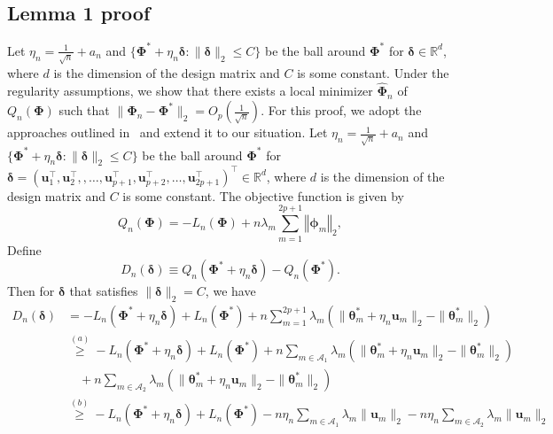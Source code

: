 \documentclass[a4paper,fleqn]{cas-sc}
\newcommand{\ddd}{,\ldots,}
\newcommand{\btheta}{\boldsymbol{\theta}}
\newcommand{\bdelta}{\boldsymbol{\delta}}
\begin{document}
\subsection{Lemma 1 proof}

{\normalsize{}Let $\eta_{n}=\frac{1}{\sqrt{n}}+a_{n}$ and $\{\boldsymbol{\Phi}^{*}+\eta_{n}\boldsymbol{\delta}:\|\boldsymbol{\delta}\|_{2}\leq C\}$
	be the ball around $\boldsymbol{\Phi}^{*}$ for $\boldsymbol{\delta}\in\mathbb{R}^{d}$,
	where $d$ is the dimension of the design matrix and $C$ is some
	constant. Under the regularity assumptions, we show that there exists
	a local minimizer $\widehat{\boldsymbol{\Phi}}_{n}$ of $Q_{n}(\boldsymbol{\Phi})$
	such that $\|\widehat{\boldsymbol{\Phi}}_{n}-\boldsymbol{\Phi}^{*}\|_{2}=O_{p}(\frac{1}{\sqrt{n}})$.
	For this proof, we adopt the approaches outlined in~\citep{fan2001variable,choi2010variable,nardi2008asymptotic,wang2007regression}
	and extend it to our situation. Let $\eta_{n}=\frac{1}{\sqrt{n}}+a_{n}$
	and $\{\boldsymbol{\Phi}^{*}+\eta_{n}\boldsymbol{\delta}:\|\boldsymbol{\delta}\|_{2}\leq C\}$
	be the ball around $\boldsymbol{\Phi}^{*}$ for $\boldsymbol{\delta}=(\mathbf{u}_{1}^{\top},\mathbf{u}_{2}^{\top},\ddd\mathbf{u}_{p+1}^{\top},\mathbf{u}_{p+2}^{\top},\ldots,\mathbf{u}_{2p+1}^{\top})^{\top}\in\mathbb{R}^{d}$,
	where $d$ is the dimension of the design matrix and $C$ is some
	constant. The objective function is given by 
	\[
	Q_{n}(\boldsymbol{\Phi})=-L_{n}(\boldsymbol{\Phi})+n\lambda_{m}\sum_{m=1}^{2p+1}\left\Vert \boldsymbol{\phi}_{m}\right\Vert _{2},
	\]
	Define
	\[
	D_{n}(\boldsymbol{\delta})\equiv Q_{n}(\boldsymbol{\Phi}^{*}+\eta_{n}\bdelta)-Q_{n}(\boldsymbol{\Phi}^{*}).
	\]
	Then for $\bdelta$ that satisfies $\|\bdelta\|_{2}=C$, we have
	\begin{align}
	D_{n}(\bdelta) & =-L_{n}(\boldsymbol{\Phi}^{*}+\eta_{n}\bdelta)+L_{n}(\boldsymbol{\Phi}^{*})+n\sum_{m=1}^{2p+1}\lambda_{m}(\|\btheta_{m}^{*}+\eta_{n}\mathbf{u}_{m}\|_{2}-\|\btheta_{m}^{*}\|_{2})\nonumber \\
	& \overset{(a)}{\geq}-L_{n}(\boldsymbol{\Phi}^{*}+\eta_{n}\bdelta)+L_{n}(\boldsymbol{\Phi}^{*})+n\sum_{m\in\mathcal{A}_{1}}\lambda_{m}(\|\btheta_{m}^{*}+\eta_{n}\mathbf{u}_{m}\|_{2}-\|\btheta_{m}^{*}\|_{2})\nonumber \\
	& \quad+n\sum_{m\in\mathcal{A}_{2}}\lambda_{m}(\|\btheta_{m}^{*}+\eta_{n}\mathbf{u}_{m}\|_{2}-\|\btheta_{m}^{*}\|_{2})\nonumber \\
	& \overset{(b)}{\geq}-L_{n}(\boldsymbol{\Phi}^{*}+\eta_{n}\bdelta)+L_{n}(\boldsymbol{\Phi}^{*})-n\eta_{n}\sum_{m\in\mathcal{A}_{1}}\lambda_{m}\|\mathbf{u}_{m}\|_{2}-n\eta_{n}\sum_{m\in\mathcal{A}_{2}}\lambda_{m}\|\mathbf{u}_{m}\|_{2}\nonumber \\

\end{align}}
\end{document}
